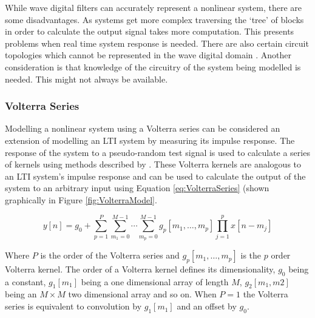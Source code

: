 			While wave digital filters can accurately represent a nonlinear system, there are some
			disadvantages. As systems get more complex traversing the `tree' of blocks in order to calculate
			the output signal takes more computation. This presents problems when real time system response is
			needed. There are also certain circuit topologies which cannot be represented in the wave digital
			domain \citep{valimaki2011virtual}. Another consideration is that knowledge of the circuitry of the
			system being modelled is needed. This might not always be available.

		\subsubsection{Volterra Series}
			Modelling a nonlinear system using a Volterra series can be considered an extension of modelling an
			LTI system by measuring its impulse response. The response of the system to a pseudo-random test
			signal is used to calculate a series of kernels using methods described by \citet{schetzen1980the}.
			These Volterra kernels are analogous to an LTI system's impulse response and can be used to
			calculate the output of the system to an arbitrary input using Equation \ref{eq:VolterraSeries}
			(shown graphically in Figure \ref{fig:VolterraModel}.

			\begin{equation}
				y[n] = g_{0} + \sum_{p = 1}^{P} 
					\sum_{m_{1} = 0}^{M - 1} \dotsi \sum_{m_{p} = 0}^{M - 1}
					g_{p}[m_{1}, \dotsc , m_{p}]
					\prod_{j = 1}^{p} x[n - m_{j}]
				\label{eq:VolterraSeries}
			\end{equation}

			Where $P$ is the order of the Volterra series and $g_{p}[m_{1}, \dotsc , m_{p}]$ is the
			$p$ order Volterra kernel. The order of a Volterra kernel defines its dimensionality,
			$g_{0}$ being a constant, $g_{1}[m_{1}]$ being a one dimensional array of length $M$, $g_{2}[m_{1},
			m{2}]$ being an $M \times M$ two dimensional array and so on. When $P = 1$ the Volterra series is
			equivalent to convolution by $g_{1}[m_{1}]$ and an offset by $g_{0}$.

